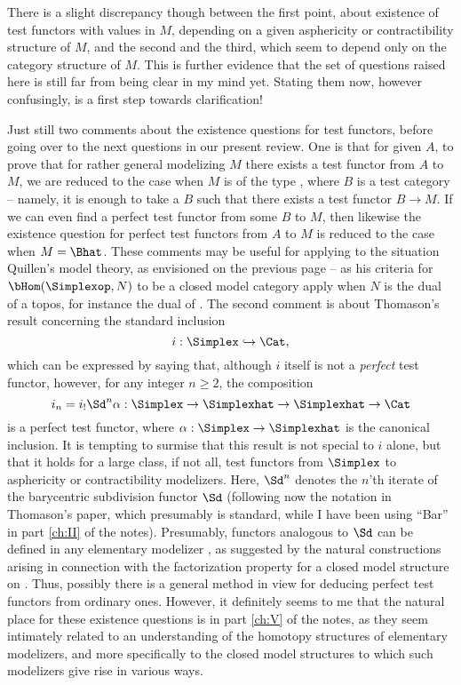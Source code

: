 There is a slight discrepancy though between the first point, about
existence of test functors with values in $M$, depending on a given
asphericity or contractibility structure of $M$, and the second and
the third, which seem to depend only on the category structure of
$M$. This is further evidence that the set of questions raised here is
still far from being clear in my mind yet. Stating them now, however
confusingly, is a first step towards clarification!

\bigbreak
\noindent\hfill{}\par

Just still two comments about the existence questions for test
functors, before going over to the next questions in our present
review. One is that for given $A$, to prove that for rather general
modelizing $M$ there exists a test functor from $A$ to $M$, we are
reduced to the case when $M$ is of the type \Bhat, where $B$ is a test
category -- namely, it is enough to take a $B$ such that there exists
a test functor $B\to M$. If we can even find a perfect test functor
from some $B$ to $M$, then likewise the existence question for perfect
test functors from $A$ to $M$ is reduced to the case when
$M=\Bhat$. These comments may be useful for applying to the situation
Quillen's model theory, as envisioned on the previous page -- as his
criteria for $\bHom(\Simplexop,N)$ to be a closed model category
apply when $N$ is the dual of a topos, for instance the dual of
\Bhat. The second comment is about Thomason's result concerning the
standard inclusion
\[i:\Simplex\hookrightarrow \Cat,\]
which can be expressed by saying that, although $i$ itself is not a
\emph{perfect} test functor, however, for any integer $n\ge2$, the
composition
\[i_n=i_!\Sd^n \alpha: \Simplex\to\Simplexhat\to\Simplexhat\to\Cat\]
is a perfect test functor, where $\alpha:\Simplex\to\Simplexhat$ is
the canonical inclusion. It is tempting to surmise that this result is
not special to $i$ alone, but that it holds for a large class, if not
all, test functors from $\Simplex$ to asphericity or contractibility
modelizers. Here, $\Sd^n$ denotes the $n$'th iterate of the
barycentric subdivision functor $\Sd$ (following now the notation in
Thomason's paper, which presumably is standard, while I have been
using ``Bar'' in part \ref{ch:II} of the notes). Presumably, functors
analogous to $\Sd$ can be defined in any elementary modelizer \Ahat,
as suggested by the natural constructions arising in connection with
the factorization property for a closed model structure on
\Ahat. Thus, possibly there is a general method in view for deducing
perfect test functors from ordinary ones. However, it definitely seems
to me that the natural place for these existence questions is in part
\ref{ch:V} of the notes, as they seem intimately related to an
understanding of the homotopy structures of elementary modelizers, and
more specifically to the closed model structures to which such
modelizers give rise in various ways.

